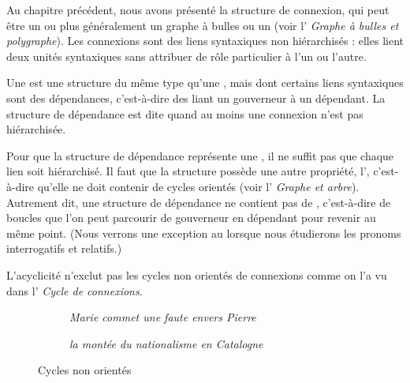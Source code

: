 Au chapitre précédent, nous avons présenté la structure de connexion, qui peut être un  ou plus généralement un graphe à bulles ou un  (voir l’ \textit{Graphe à bulles et polygraphe}). Les connexions sont des liens syntaxiques non hiérarchisés : elles lient deux unités syntaxiques sans attribuer de rôle particulier à l’un ou l’autre.

{Une  est une structure du même type qu’une , mais dont certains liens syntaxiques sont des dépendances, c’est-à-dire des  liant un gouverneur à un dépendant. La structure de dépendance est dite  quand au moins une connexion n’est pas hiérarchisée.}

Pour que la structure de dépendance représente une , il ne suffit pas que chaque lien soit hiérarchisé. Il faut que la structure possède une autre propriété, l’, c’est-à-dire qu’elle ne doit contenir de cycles orientés (voir l’ \textit{Graphe et arbre}). Autrement dit, une structure de dépendance ne contient pas de , c’est-à-dire de boucles que l’on peut parcourir de gouverneur en dépendant pour revenir au même point. (Nous verrons une exception au  lorsque nous étudierons les pronoms interrogatifs et relatifs.)

L’acyclicité n’exclut pas les cycles non orientés de connexions comme on l’a vu dans l’ \textit{Cycle de connexions}.

\begin{figure}
\begin{subfigure}[b]{.5\textwidth}\centering
{}
\caption{\textit{Marie commet une faute envers Pierre}}
\end{subfigure}%
\begin{subfigure}[b]{.5\textwidth}\centering
{}
\caption{\textit{la montée du nationalisme en Catalogne}}
\end{subfigure}
\caption{Cycles non orientés\label{fig:}}
\end{figure}

